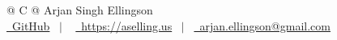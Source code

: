 \documentclass[letterpaper, 11pt]{article}
\begin{document}
\pagestyle{empty} 



\begin{tabularx}{\linewidth}{@{} C @{}}
\Huge{Arjan Singh Ellingson} \\[7.5pt]
\href{https://github.com/aselling-us}{\raisebox{-0.05\height}\faGithub\ GitHub} \ $|$ \ 
\href{https://aselling.us}{\raisebox{-0.05\height}\faGlobe \ https://aselling.us} \ $|$ \ 
\href{mailto:arjan.ellingson@gmail.com}{\raisebox{-0.05\height}\faEnvelope \ arjan.ellingson@gmail.com} \ 
\end{tabularx}

\end{document}
